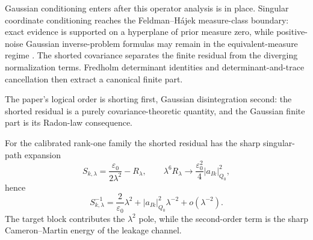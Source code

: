 \documentclass[preprint,12pt]{elsarticle}
\theoremstyle{plain}
\theoremstyle{definition}
\theoremstyle{remark}
\begin{document}
    Gaussian conditioning enters after this operator analysis is in
    place.  Singular coordinate conditioning reaches the Feldman--H\'{a}jek
    measure-class boundary: exact evidence is supported on a hyperplane of
    prior measure zero, while positive-noise Gaussian inverse-problem formulas may remain in
    the equivalent-measure regime
    \cite{feldman1958equivalence,hajek1958property,bogachev1998gaussian,stuart2010inverse,carerelie2024covariance,carerelie2025mean}.
    The shorted covariance separates the finite residual from the diverging
    normalization terms.  Fredholm determinant identities and
    determinant-and-trace cancellation then extract a canonical finite part.

    The paper's logical order is shorting first, Gaussian disintegration
    second: the shorted residual is a purely covariance-theoretic quantity, and
    the Gaussian finite part is its Radon-law consequence.

    For the calibrated rank-one family the shorted residual has the sharp
    singular-path expansion
    \[
    S_{k,\lambda}=\frac{\varepsilon_0}{2\lambda^2}-R_\lambda,
    \qquad
    \lambda^6R_\lambda\to\frac{\varepsilon_0^2}{4}|a_{Ik}|_{Q_0}^2,
    \]
    hence
    \[
    S_{k,\lambda}^{-1}=\frac{2}{\varepsilon_0}\lambda^2
    +|a_{Ik}|_{Q_0}^2\lambda^{-2}+o(\lambda^{-2}).
    \]
    The target block contributes the $\lambda^2$ pole, while the second-order
    term is the sharp Cameron--Martin energy of the leakage channel.
\end{document}
